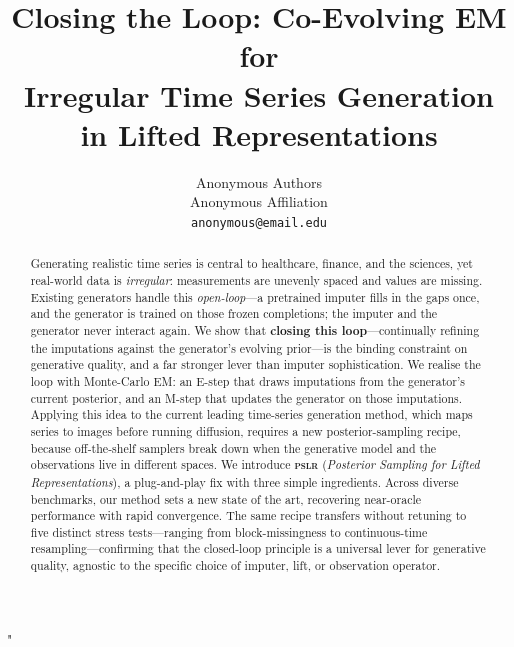 "\documentclass{article}
\title{Closing the Loop: Co-Evolving EM for \\ Irregular Time Series Generation in Lifted Representations}
\author{%
  Anonymous Authors \\
  Anonymous Affiliation \\
  \texttt{anonymous@email.edu} \\
}
\theoremstyle{plain}
\theoremstyle{definition}
\theoremstyle{remark}
\newcommand{\pslr}{\textsc{pslr}}
\begin{document}
\maketitle

\begin{abstract}
Generating realistic time series is central to healthcare, finance, and the sciences, yet real-world data is \emph{irregular}: measurements are unevenly spaced and values are missing. Existing generators handle this \emph{open-loop}---a pretrained imputer fills in the gaps once, and the generator is trained on those frozen completions; the imputer and the generator never interact again. We show that \textbf{closing this loop}---continually refining the imputations against the generator's evolving prior---is the binding constraint on generative quality, and a far stronger lever than imputer sophistication. We realise the loop with Monte-Carlo EM: an E-step that draws imputations from the generator's current posterior, and an M-step that updates the generator on those imputations. Applying this idea to the current leading time-series generation method, which maps series to images before running diffusion, requires a new posterior-sampling recipe, because off-the-shelf samplers break down when the generative model and the observations live in different spaces. We introduce \textbf{\pslr{}} (\emph{Posterior Sampling for Lifted Representations}), a plug-and-play fix with three simple ingredients. Across diverse benchmarks, our method sets a new state of the art, recovering near-oracle performance with rapid convergence. The same recipe transfers without retuning to five distinct stress tests—ranging from block-missingness to continuous-time resampling—confirming that the closed-loop principle is a universal lever for generative quality, agnostic to the specific choice of imputer, lift, or observation operator.

\end{abstract}
\end{document}

